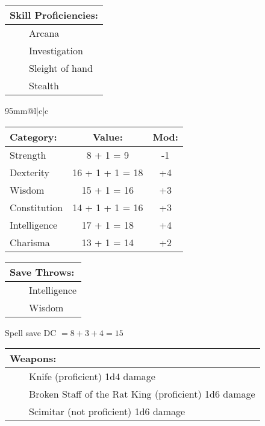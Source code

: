 \documentclass[11pt]{article}
\newcommand{\tabitem}{~~\llap{--}~~}
\begin{document}
\begin{multicols}{2}
\vspace{2mm}
		
\noindent \begin{tabularx}{95mm}{@{}l}
{\Large \textbf{Skill Proficiencies:}} \\
\hline
\tabitem Arcana \\
\tabitem Investigation \\
\tabitem Sleight of hand \\
\tabitem Stealth
		\end{tabularx}

\vspace{4mm}

\noindent \begin{tabularx}{95mm}{@{}l|c|c}
 \\
\hline
		\end{tabularx}
\noindent \begin{tabular}{@{}l|c|c}
\textbf{Category:} 			& \textbf{Value:} 	& \textbf{Mod:} \\
\hline
Strength 					& 8 + 1 = 9 		& -1 			\\
Dexterity 					& 16 + 1 + 1 = 18 	& +4 			\\
Wisdom 						& 15 + 1 = 16		& +3 			\\
Constitution 				& 14 + 1 + 1 = 16	& +3 			\\
Intelligence 				& 17 + 1 = 18		& +4 			\\
Charisma 					& 13 + 1 = 14		& +2
		\end{tabular}

\vspace{4mm}

\noindent \begin{tabularx}{95mm}{@{}l}
{\Large \textbf{Save Throws:}} \\
\hline
\tabitem Intelligence \\
\tabitem Wisdom
		\end{tabularx}
\noindent Spell save DC $= 8 + 3 + 4 = 15$

\vspace{4mm}

\noindent \begin{tabularx}{95mm}{@{}l}
{\Large \textbf{Weapons:}} \\
\hline
\tabitem Knife (proficient) 1d4 damage \\
\tabitem Broken Staff of the Rat King (proficient) 1d6 damage \\
\tabitem Scimitar (not proficient) 1d6 damage \\
		\end{tabularx}


\end{multicols}
\end{document}
